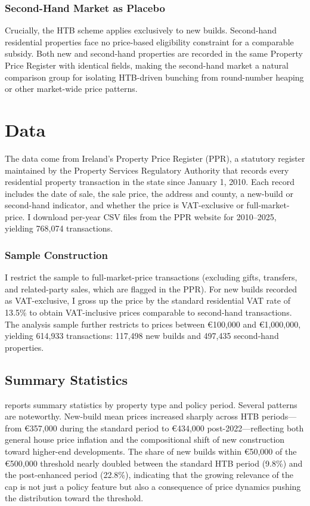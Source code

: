 \documentclass[12pt]{article}
\newcommand{\eur}[1]{\euro{}#1}
\begin{document}
\subsubsection*{Second-Hand Market as Placebo} Crucially, the HTB scheme applies exclusively to new builds. Second-hand residential properties face no price-based eligibility constraint for a comparable subsidy. Both new and second-hand properties are recorded in the same Property Price Register with identical fields, making the second-hand market a natural comparison group for isolating HTB-driven bunching from round-number heaping or other market-wide price patterns.


\section{Data}

The data come from Ireland's Property Price Register (PPR), a statutory register maintained by the Property Services Regulatory Authority that records every residential property transaction in the state since January 1, 2010. Each record includes the date of sale, the sale price, the address and county, a new-build or second-hand indicator, and whether the price is VAT-exclusive or full-market-price. I download per-year CSV files from the PPR website for 2010--2025, yielding 768,074 transactions.

\subsubsection*{Sample Construction} I restrict the sample to full-market-price transactions (excluding gifts, transfers, and related-party sales, which are flagged in the PPR). For new builds recorded as VAT-exclusive, I gross up the price by the standard residential VAT rate of 13.5\% to obtain VAT-inclusive prices comparable to second-hand transactions. The analysis sample further restricts to prices between \eur{100,000} and \eur{1,000,000}, yielding 614,933 transactions: 117,498 new builds and 497,435 second-hand properties.

\subsection{Summary Statistics}

 reports summary statistics by property type and policy period. Several patterns are noteworthy. New-build mean prices increased sharply across HTB periods---from \eur{357,000} during the standard period to \eur{434,000} post-2022---reflecting both general house price inflation and the compositional shift of new construction toward higher-end developments. The share of new builds within \eur{50,000} of the \eur{500,000} threshold nearly doubled between the standard HTB period (9.8\%) and the post-enhanced period (22.8\%), indicating that the growing relevance of the cap is not just a policy feature but also a consequence of price dynamics pushing the distribution toward the threshold.
\end{document}
